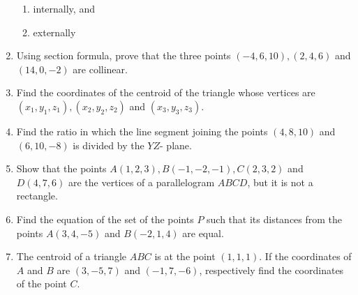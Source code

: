\documentclass{article}
\theoremstyle{remark}
\begin{document}
\begin{enumerate}
\begin{enumerate}[label=(\roman*)]
\item internally, and
\item externally
\end{enumerate}
\item Using section formula, prove that the three points $(-4,6,10), (2,4,6)$ and $(14,0,-2)$ are collinear.
\item Find the coordinates of the centroid of the triangle whose vertices are $(x_1,y_1,z_1), (x_2,y_2,z_2)$ and $(x_3,y_3,z_3)$.
\item Find the ratio in which the line segment joining the points $(4,8,10)$ and $(6,10,-8)$ is divided by the $YZ$- plane.
\item Show that the points $A(1,2,3), B(-1,-2,-1), C(2,3,2)$ and $D(4,7,6)$ are the vertices of a parallelogram $ABCD$, but it is not a rectangle.
\item Find the equation of the set of the points $P$ such that its distances from the points $A(3,4,-5)$ and $B(-2,1,4)$ are equal.
\item The centroid of a triangle $ABC$ is at the point $(1,1,1)$. If the coordinates of $A$ and $B$ are $(3,-5,7)$ and $(-1,7,-6)$, respectively find the coordinates of the point $C$.
\end{enumerate}
\end{document}
